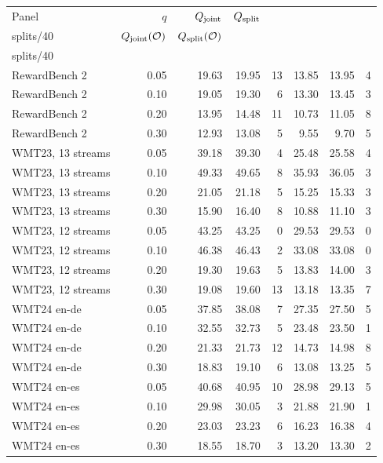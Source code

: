 \begin{table}[t]
\centering\small
\begin{tabular}{lrrrrrrr}
\toprule
Panel & $q$ & $Q_{\rm joint}$ & $Q_{\rm split}$ & \shortstack{$Q_{\rm joint}<Q_{\rm split}$\\splits/40} & $Q_{\rm joint}(\mathcal O)$ & $Q_{\rm split}(\mathcal O)$ & \shortstack{$Q_{\rm joint}<Q_{\rm split}$\\splits/40} \\
\midrule
RewardBench 2 & 0.05 & 19.63 & 19.95 & 13 & 13.85 & 13.95 & 4 \\
RewardBench 2 & 0.10 & 19.05 & 19.30 & 6 & 13.30 & 13.45 & 3 \\
RewardBench 2 & 0.20 & 13.95 & 14.48 & 11 & 10.73 & 11.05 & 8 \\
RewardBench 2 & 0.30 & 12.93 & 13.08 & 5 & 9.55 & 9.70 & 5 \\
WMT23, 13 streams & 0.05 & 39.18 & 39.30 & 4 & 25.48 & 25.58 & 4 \\
WMT23, 13 streams & 0.10 & 49.33 & 49.65 & 8 & 35.93 & 36.05 & 3 \\
WMT23, 13 streams & 0.20 & 21.05 & 21.18 & 5 & 15.25 & 15.33 & 3 \\
WMT23, 13 streams & 0.30 & 15.90 & 16.40 & 8 & 10.88 & 11.10 & 3 \\
WMT23, 12 streams & 0.05 & 43.25 & 43.25 & 0 & 29.53 & 29.53 & 0 \\
WMT23, 12 streams & 0.10 & 46.38 & 46.43 & 2 & 33.08 & 33.08 & 0 \\
WMT23, 12 streams & 0.20 & 19.30 & 19.63 & 5 & 13.83 & 14.00 & 3 \\
WMT23, 12 streams & 0.30 & 19.08 & 19.60 & 13 & 13.18 & 13.35 & 7 \\
WMT24 en-de & 0.05 & 37.85 & 38.08 & 7 & 27.35 & 27.50 & 5 \\
WMT24 en-de & 0.10 & 32.55 & 32.73 & 5 & 23.48 & 23.50 & 1 \\
WMT24 en-de & 0.20 & 21.33 & 21.73 & 12 & 14.73 & 14.98 & 8 \\
WMT24 en-de & 0.30 & 18.83 & 19.10 & 6 & 13.08 & 13.25 & 5 \\
WMT24 en-es & 0.05 & 40.68 & 40.95 & 10 & 28.98 & 29.13 & 5 \\
WMT24 en-es & 0.10 & 29.98 & 30.05 & 3 & 21.88 & 21.90 & 1 \\
WMT24 en-es & 0.20 & 23.03 & 23.23 & 6 & 16.23 & 16.38 & 4 \\
WMT24 en-es & 0.30 & 18.55 & 18.70 & 3 & 13.20 & 13.30 & 2 \\

\end{tabular}
\end{table}
